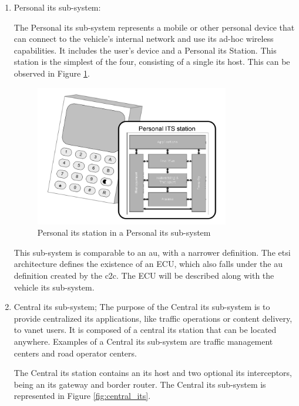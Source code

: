 \begin{enumerate}
	\item Personal \gls{its} sub-system:

The Personal \gls{its} sub-system represents a mobile or other personal device that can connect to the vehicle's internal network and use its ad-hoc wireless capabilities. It includes the user's device and a Personal \gls{its} Station. This station is the simplest of the four, consisting of a single \gls{its} host. This can be observed in Figure \ref{fig:personal_its}.

\begin{figure}[htbp]
    \centering
   	\includegraphics[width=0.8\textwidth]{Chapters/Figures/VANETs/personal_ITS.png}
   	\caption{Personal \gls{its} station in a Personal \gls{its} sub-system~\cite{etsi_intelligent_2010}}
   	\label{fig:personal_its}
\end{figure}


This sub-system is comparable to an \gls{au}, with a narrower definition. The \gls{etsi} architecture defines the existence of an ECU, which also falls under the \gls{au} definition created by the \gls{c2c}. The ECU will be described along with the vehicle \gls{its} sub-system.
	\item Central \gls{its} sub-system;
The purpose of the Central \gls{its} sub-system is to provide centralized \gls{its} applications, like traffic operations or content delivery, to \gls{vanet} users. It is composed of a central \gls{its} station that can be located anywhere. Examples of a Central \gls{its} sub-system are traffic management centers and road operator centers.

The Central \gls{its} station contains an \gls{its} host and two optional \gls{its} interceptors, being an \gls{its} gateway and border router. The Central \gls{its} sub-system is represented in Figure \ref{fig:central_its}.


\end{enumerate}
